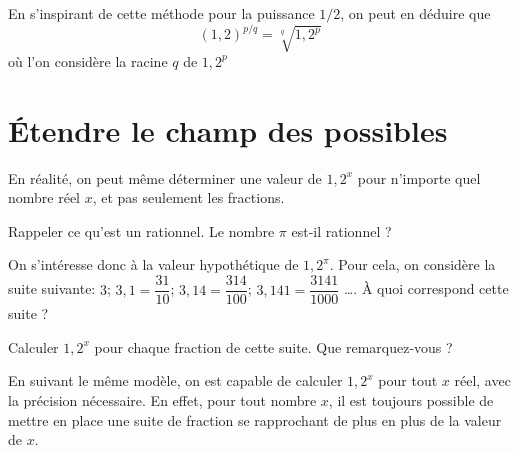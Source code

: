 \documentclass{exos}
\begin{document}
En s'inspirant de cette méthode pour la puissance $1/2$, on peut en déduire que 
\begin{equation*}
(1,2)^{p/q} = \sqrt[q]{1,2^p}
\end{equation*}
où l'on considère la racine $q$\ieme{} de $1,2^p$

\section{Étendre le champ des possibles}
En réalité, on peut même déterminer une valeur de $1,2^x$ pour n'importe quel nombre réel $x$, et pas seulement les fractions.

\begin{alphaquestions}
\item Rappeler ce qu'est un rationnel. Le nombre $\pi$ est-il rationnel ?
\item On s'intéresse donc à la valeur hypothétique de $1,2^{\pi}$. Pour cela, on considère la suite suivante: $3$; $3,1 = \dfrac{31}{10}$; $3,14 = \dfrac{314}{100}$; $3,141 = \dfrac{3141}{1000}$ \dots. À quoi correspond cette suite ?
\item Calculer $1,2^x$ pour chaque fraction de cette suite. Que remarquez-vous ?
\end{alphaquestions}
\begin{tcolorbox}
En suivant le même modèle, on est capable de calculer $1,2^x$ pour tout $x$ réel, avec la précision nécessaire. En effet, pour tout nombre $x$, il est toujours possible de mettre en place une suite de fraction se rapprochant de plus en plus de la valeur de $x$.
\end{tcolorbox}
\end{document}
